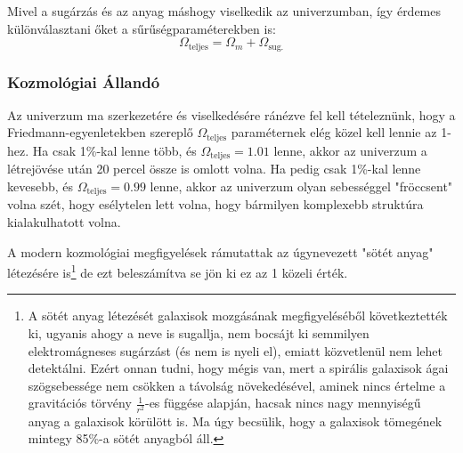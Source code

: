 \documentclass[../main.tex]{subfiles}
\begin{document}
Mivel a sugárzás és az anyag máshogy viselkedik az univerzumban, így érdemes különválasztani őket a sűrűségparaméterekben is:
\begin{equation}
    \Omega_{\text{teljes}} = \Omega_m + \Omega_\text{sug.}
\end{equation}

\subsubsection{Kozmológiai Állandó}
Az univerzum ma szerkezetére és viselkedésére ránézve fel kell tételeznünk, hogy a Friedmann-egyenletekben szereplő $\Omega_\text{teljes}$ paraméternek elég közel kell lennie az 1-hez. Ha csak 1\%-kal lenne több, és $\Omega_\text{teljes} = 1.01$ lenne,
akkor az univerzum a létrejövése után 20 percel össze is omlott volna. Ha pedig csak 1\%-kal lenne kevesebb, és $\Omega_\text{teljes} = 0.99$ lenne, akkor az univerzum olyan sebességgel "fröccsent" volna szét, hogy esélytelen lett volna, hogy bármilyen komplexebb struktúra
kialakulhatott volna. 

A modern kozmológiai megfigyelések rámutattak az úgynevezett "sötét anyag" létezésére is\footnote{
    A sötét anyag létezését galaxisok mozgásának megfigyeléséből következtették ki, ugyanis ahogy a neve is sugallja, nem bocsájt ki semmilyen elektromágneses sugárzást (és nem is nyeli el), emiatt közvetlenül nem lehet detektálni.
    Ezért onnan tudni, hogy mégis van, mert a spirális galaxisok ágai szögsebessége nem csökken a távolság növekedésével, aminek nincs értelme a gravitációs törvény $\frac{1}{r^2}$-es függése alapján, hacsak nincs nagy mennyiségű anyag a galaxisok körülött is.
    Ma úgy becsülik, hogy a galaxisok tömegének mintegy 85\%-a sötét anyagból áll.
}
de ezt beleszámítva se jön ki ez az 1 közeli érték. 
\end{document}
